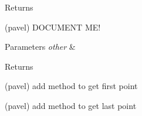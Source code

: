 \begin{DoxyRefList}
\begin{DoxyReturn}{Returns}
\end{DoxyReturn}

\item[\label{todo__todo000008}%
\hypertarget{todo__todo000008}{}%
Member \hyperlink{classsimo_1_1shapes_1_1_point_a32b64226c96ab13e4b44e7437c2f6b3e}{simo\-:\-:shapes\-:\-:Point\-:\-:operator==} (const Point \&other) const ](pavel) D\-O\-C\-U\-M\-E\-N\-T M\-E! 
\begin{DoxyParams}{Parameters}
{\em other} & \\
\hline
\end{DoxyParams}
\begin{DoxyReturn}{Returns}

\end{DoxyReturn}

\item[\label{todo__todo000012}%
\hypertarget{todo__todo000012}{}%
Class \hyperlink{classsimo_1_1shapes_1_1_point_collection}{simo\-:\-:shapes\-:\-:Point\-Collection$<$ Derived $>$} ](pavel) add method to get first point 

(pavel) add method to get last point 
\end{DoxyRefList}